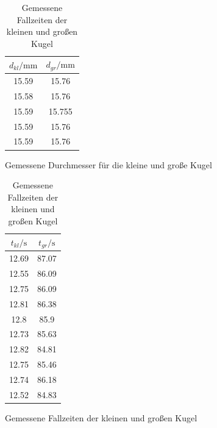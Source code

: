 \begin{table}
  \centering
  \caption{Messwerte des ersten Versuchteils}
  \begin{subfigure}{0.48\textwidth}
    \centering
  \begin{tabular}{c c}
    \toprule
    $d_{kl} /\si{\milli\meter}$ & $d_{gr}/ \si{\milli\meter}$ \\
    \midrule
    15.59 & 15.76 \\
    15.58 & 15.76 \\
    15.59 & 15.755 \\
    15.59 & 15.76 \\
    15.59 & 15.76 \\
    \bottomrule
  \end{tabular}
  \caption{Gemessene Durchmesser für die kleine und große Kugel}
  \label{tab:dtab}
  \end{subfigure}
  \begin{subfigure}{0.48\textwidth}
    \centering
        \begin{tabular}{c c}
          \toprule
          $t_{kl} / \si{\second}$ & $t_{gr} / \si{\second} $\\
          \midrule
          12.69 & 87.07 \\
          12.55 & 86.09 \\
          12.75 & 86.09 \\
          12.81  & 86.38 \\
          12.8 & 85.9 \\
          12.73 & 85.63 \\
          12.82 & 84.81 \\
          12.75 & 85.46 \\
          12.74 & 86.18 \\
          12.52 & 84.83 \\
          \bottomrule
        \end{tabular}
        \caption{Gemessene Fallzeiten der kleinen und großen Kugel}
        \label{tab:t}
\end{subfigure}
\end{table}
\FloatBarrier

